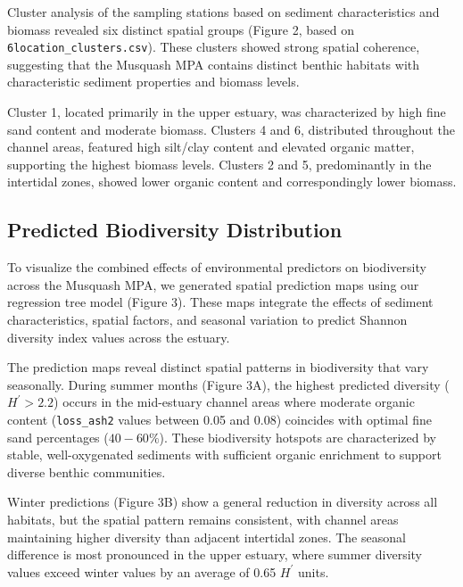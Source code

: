 \documentclass[12pt]{article}
\begin{document}
\qquad Cluster analysis of the sampling stations based on sediment
characteristics and biomass revealed six distinct spatial groups (Figure 2,
based on \texttt{6location\_clusters.csv}). These clusters showed strong spatial
coherence, suggesting that the Musquash MPA contains distinct benthic habitats
with characteristic sediment properties and biomass levels.


\qquad Cluster 1, located primarily in the upper estuary, was characterized by
high fine sand content and moderate biomass. Clusters 4 and 6, distributed
throughout the channel areas, featured high silt/clay content and elevated
organic matter, supporting the highest biomass levels. Clusters 2 and 5,
predominantly in the intertidal zones, showed lower organic content and
correspondingly lower biomass.

\subsection{Predicted Biodiversity Distribution}

\qquad To visualize the combined effects of environmental predictors on
biodiversity across the Musquash MPA, we generated spatial prediction maps using
our regression tree model (Figure 3). These maps integrate the effects of
sediment characteristics, spatial factors, and seasonal variation to predict
Shannon diversity index values across the estuary.


\qquad The prediction maps reveal distinct spatial patterns in biodiversity that
vary seasonally. During summer months (Figure 3A), the highest predicted
diversity ($H^{\prime} > 2.2$) occurs in the mid-estuary channel areas where
moderate organic content (\texttt{loss\_ash2} values between 0.05 and 0.08)
coincides with optimal fine sand percentages ($40-60\%$). These biodiversity
hotspots are characterized by stable, well-oxygenated sediments with sufficient
organic enrichment to support diverse benthic communities.

\qquad Winter predictions (Figure 3B) show a general reduction in diversity
across all habitats, but the spatial pattern remains consistent, with channel
areas maintaining higher diversity than adjacent intertidal zones. The seasonal
difference is most pronounced in the upper estuary, where summer diversity
values exceed winter values by an average of 0.65 $H^{\prime}$ units.
\end{document}
